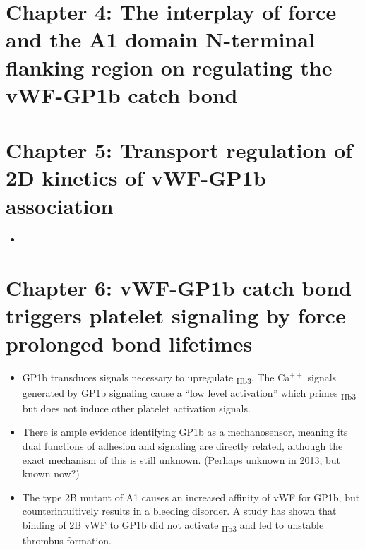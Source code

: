 \documentclass[
10pt, %
letterpaper, %
twocolumn, %
landscape %
]{article}
\newcommand{\inta}[1]{\textalpha\textsubscript{#1}}
\newcommand{\intb}[1]{\textbeta\textsubscript{#1}}
\begin{document}

\section{Chapter 4: The interplay of force and the A1 domain
  N-terminal flanking region on regulating the vWF-GP1b\inta{} 
  catch bond}
\label{sec:chapter4}




\section{Chapter 5: Transport regulation of 2D kinetics of
  vWF-GP1b\inta{} association}
\label{sec:chapter5}

\begin{itemize}
\item 
\end{itemize}


\section{Chapter 6: vWF-GP1b\inta{} catch bond triggers platelet
  signaling by force prolonged bond lifetimes}
\label{sec:chapter6}

\begin{itemize}
\item GP1b\inta{} transduces signals necessary to upregulate
  \inta{IIb}\intb{3}. The Ca$^{++}$ signals generated by GP1b\inta{}
  signaling cause a ``low level activation'' which primes
  \inta{IIb}\intb{3} but does not induce other platelet activation
  signals. 
\item There is ample evidence identifying GP1b\inta{} as a
  mechanosensor, meaning its dual functions of adhesion and signaling
  are directly related, although the exact mechanism of this is still
  unknown. (Perhaps unknown in 2013, but known now?)
\item The type 2B mutant of A1 causes an increased affinity of vWF for
  GP1b\inta{}, but counterintuitively results in a bleeding
  disorder. A study has shown that binding of 2B vWF to GP1b\inta{}
  did not activate \inta{IIb}\intb{3} and led to unstable thrombus
  formation. 
\end{itemize}

\end{document}
